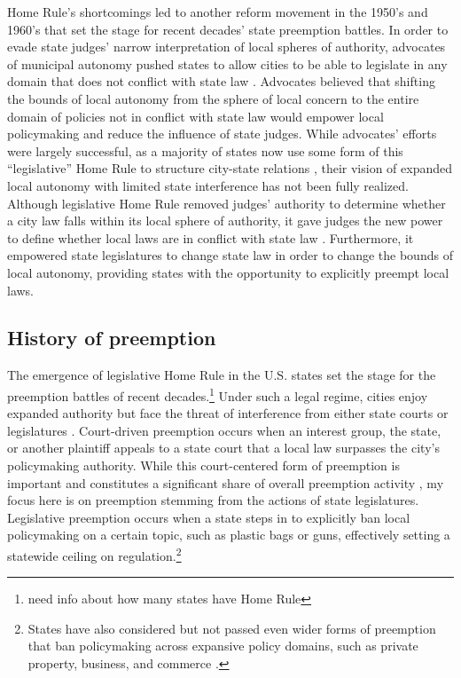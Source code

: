 \documentclass[12pt]{article}
\begin{document}
Home Rule's shortcomings led to another reform movement in the 1950's and 1960's that set the stage for recent decades' state preemption battles. In order to evade state judges' narrow interpretation of local spheres of authority, advocates of municipal autonomy pushed states to allow cities to be able to legislate in any domain that does not conflict with state law \parencite{dillerIntrastatePreemption2007}. Advocates believed that shifting the bounds of local autonomy from the sphere of local concern to the entire domain of policies not in conflict with state law would empower local policymaking and reduce the influence of state judges. While advocates' efforts were largely successful, as a majority of states now use some form of this ``legislative'' Home Rule to structure city-state relations \parencite[p. 1126]{dillerIntrastatePreemption2007}, their vision of expanded local autonomy with limited state interference has not been fully realized. Although legislative Home Rule removed judges' authority to determine whether a city law falls within its local sphere of authority, it gave judges the new power to define whether local laws are in conflict with state law \parencite{dillerIntrastatePreemption2007}. Furthermore, it empowered state legislatures to change state law in order to change the bounds of local autonomy, providing states with the opportunity to explicitly preempt local laws. 

\subsection*{History of preemption}
The emergence of legislative Home Rule in the U.S. states set the stage for the preemption battles of recent decades.\footnote{need info about how many states have Home Rule} Under such a legal regime, cities enjoy expanded authority but face the threat of interference from either state courts or legislatures \parencite{dillerIntrastatePreemption2007,goodmanStateLegislativeIdeology2019}. Court-driven preemption occurs when an interest group, the state, or another plaintiff appeals to a state court that a local law surpasses the city's policymaking authority. While this court-centered form of preemption is important and constitutes a significant share of overall preemption activity \parencite{swansonStateGovernmentPreemption2018,dillerIntrastatePreemption2007}, my focus here is on preemption stemming from the actions of state legislatures. Legislative preemption occurs when a state steps in to explicitly ban local policymaking on a certain topic, such as plastic bags or guns, effectively setting a statewide ceiling on regulation.\footnote{States have also considered but not passed even wider forms of preemption that ban policymaking across expansive policy domains, such as private property, business, and commerce \parencite[p. 2007]{briffaultChallengeNewPreemption2018}.}
\end{document}
